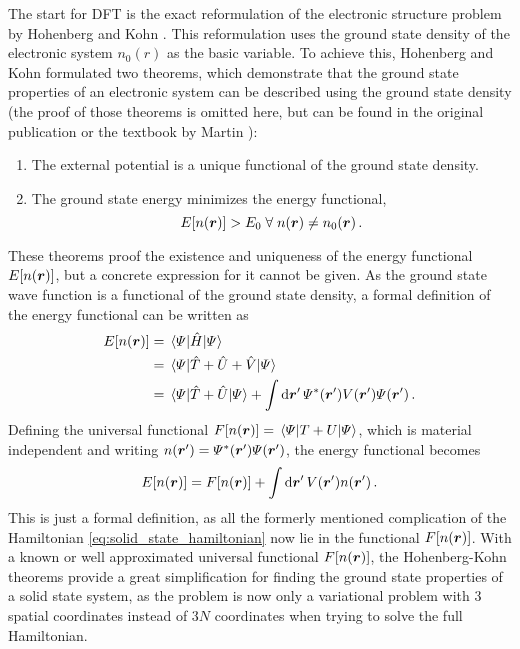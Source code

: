 \documentclass[main.tex]{subfiles}
\begin{document}
The start for DFT is the exact reformulation of the electronic structure problem by Hohenberg and Kohn \cite{hohenberg_inhomogeneous_1964}.
This reformulation uses the ground state density of the electronic system \(n_0 (r)\) as the basic variable.
To achieve this, Hohenberg and Kohn \cite{hohenberg_inhomogeneous_1964} formulated two theorems, which demonstrate that the ground state properties of an electronic system can be described using the ground state density (the proof of those theorems is omitted here, but can be found in the original publication \cite{hohenberg_inhomogeneous_1964} or the textbook by Martin \cite[chapter 6.2]{martin_electronic_2004}):
\begin{enumerate}[I]
    \item The external potential is a unique functional of the ground state density.
    \item The ground state energy minimizes the energy functional,
    \[E[n(\vb*{r})] > E_0 \;\forall\; n(\vb*{r}) \neq n_0 (\vb*{r})\,.\]
\end{enumerate}
These theorems proof the existence and uniqueness of the energy functional \(E[n(\vb*{r})]\), but a concrete expression for it cannot be given.
As the ground state wave function is a functional of the ground state density, a formal definition of the energy functional can be written as
\begin{align*}
    E[n(\vb*{r})] &= \expval{\hat{H}}{\Psi} \\
    &= \expval{\hat{T} + \hat{U} + \hat{V}}{\Psi} \\
    &= \expval{\hat{T} + \hat{U}}{\Psi} + \int \dd{\vb*{r}^{\prime}} \Psi^* (\vb*{r}^{\prime}) V(\vb*{r}^{\prime}) \Psi (\vb*{r}^{\prime})\,.
\end{align*}
Defining the universal functional \(F[n(\vb*{r})] = \expval{T + U}{\Psi}\), which is material independent and writing \(n (\vb*{r}^{\prime}) = \Psi^* (\vb*{r}^{\prime}) \Psi (\vb*{r}^{\prime})\), the energy functional becomes
\begin{equation}\label{eq:hohenberg_kohn_energy_functional}
    E[n(\vb*{r})] = F[n(\vb*{r})] + \int \dd{\vb*{r}^{\prime}} V(\vb*{r}^{\prime}) n (\vb*{r}^{\prime})\,.
\end{equation}
This is just a formal definition, as all the formerly mentioned complication of the Hamiltonian \ref{eq:solid_state_hamiltonian} now lie in the functional \(F[n(\vb*{r})]\).
With a known or well approximated universal functional \(F[n(\vb*{r})]\), the Hohenberg-Kohn theorems provide a great simplification for finding the ground state properties of a solid state system, as the problem is now only a variational problem with 3 spatial coordinates instead of \(3N\) coordinates when trying to solve the full Hamiltonian.
\end{document}
